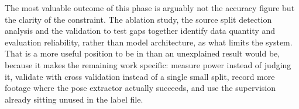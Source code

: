 The most valuable outcome of this phase is arguably not the accuracy figure but the clarity of the constraint. The ablation study, the source split detection analysis and the validation to test gaps together identify data quantity and evaluation reliability, rather than model architecture, as what limits the system. That is a more useful position to be in than an unexplained result would be, because it makes the remaining work specific: measure power instead of judging it, validate with cross validation instead of a single small split, record more footage where the pose extractor actually succeeds, and use the supervision already sitting unused in the label file.

\clearpage
